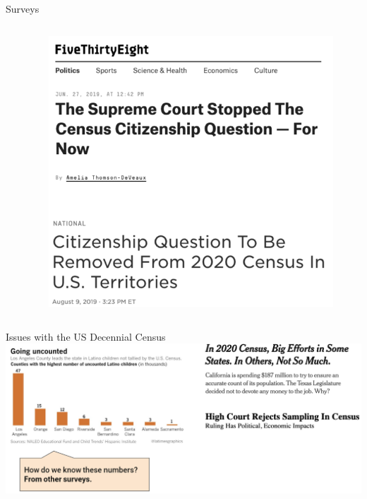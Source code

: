 \documentclass[aspectratio=169]{../latex_main/tntbeamer}  %
\begin{document}
\begin{frame}{Surveys}
\begin{columns}
\begin{column}{.4\textwidth}
	         \end{column}
	         \begin{column}{.4\textwidth}
	                \begin{figure}
	                    \centering
	                    \includegraphics[scale=.35]{Bild7}
	                \end{figure}
	                

	         \end{column}
	     \end{columns}
	\end{frame}
	
	
	\begin{frame}{Issues with the US Decennial Census}
	    \includegraphics[scale=.4]{Bild8}
	\end{frame}
	
\end{document}
